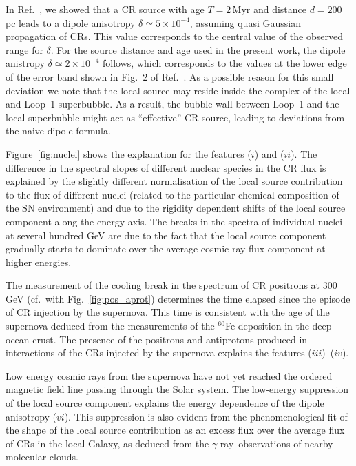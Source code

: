 \documentclass[prd,aps,twocolumn]{revtex4}
\def\gr{$\gamma$-ray}
\begin{document}
In Ref.~\cite{savchenko}, we showed that a CR source with age $T=2$\,Myr
and distance $d=200$\,pc leads to a dipole anisotropy 
$\delta \simeq 5\times 10^{-4}$, assuming quasi Gaussian propagation of CRs.
This value corresponds to the central value of the observed
range for $\delta$. For the source distance and age used in the present work, 
the  dipole anistropy  $\delta \simeq 2\times 10^{-4}$ follows,
which corresponds to the values at the lower edge of the error band shown in 
Fig.~2 of  Ref.~\cite{savchenko}. As a possible reason for this small 
deviation we note that the local source may reside inside  the complex of
the local and Loop~1 superbubble. As a result, the bubble wall between Loop~1 
and the local superbubble might act as ``effective'' CR source, leading to 
deviations from the naive dipole formula.


Figure~\ref{fig:nuclei} shows the explanation for the features ($i$) and 
($ii$). The difference in the spectral slopes of different nuclear species 
in the CR flux is explained by the slightly different normalisation of the 
local source contribution to the flux of different nuclei (related to the
particular chemical composition of the SN environment) and due to the 
rigidity dependent shifts of the local source component along the energy axis. 
The breaks in the spectra of individual nuclei at several hundred GeV are 
due to the fact that the local source component gradually starts to dominate 
over the average cosmic ray flux component at higher energies. 

The measurement of the cooling break in the spectrum of CR positrons at 
300\,GeV (cf.\ with Fig.~\ref{fig:pos_aprot}) determines the 
time elapsed since the episode of CR injection by the supernova. This time 
is consistent with the age of the supernova deduced from the measurements of 
the $^{60}$Fe deposition in the deep ocean crust. The presence of the 
positrons and antiprotons produced in interactions of the CRs injected by 
the supernova explains the features ($iii$)--($iv$). 

Low energy cosmic rays from the supernova have not yet reached the ordered 
magnetic field line passing through the Solar system. The low-energy 
suppression of the local source component explains the energy dependence 
of the dipole anisotropy ($vi$). This suppression is also evident from the 
phenomenological fit of the shape of the local source contribution as an 
excess flux over the average flux of CRs in the local Galaxy, as deduced 
from the \gr\ observations of nearby molecular clouds. 
\end{document}
